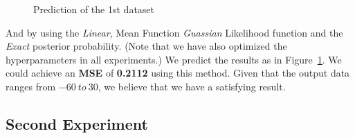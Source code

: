 \begin{figure}[htp]
\begin{minipage}[htp]{1\linewidth}
	\centering
\caption{Prediction of the 1st dataset}
\label{fig:predict1} %
\end{minipage}
\vspace{-0.05in}
\end{figure}

And by using the \emph{Linear}, Mean Function \emph{Guassian} Likelihood function and the \emph{Exact} posterior probability.
(Note that we have also optimized the hyperparameters in all experiments.)
We predict the results as in Figure~\ref{fig:predict1}.
We could achieve an \textbf{MSE} of \textbf{0.2112} using this method. Given that the output data ranges from $-60~ to~30$, we believe that we have a satisfying result.



\subsection{Second Experiment}

